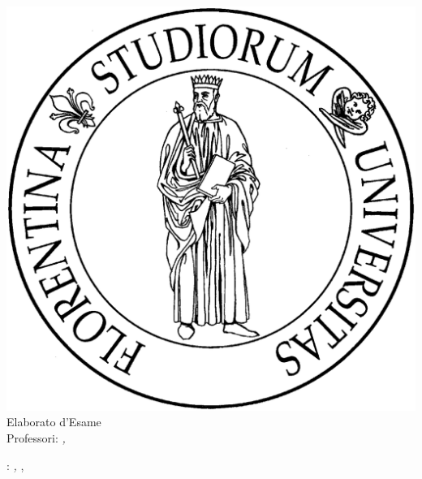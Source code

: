 \begin{titlepage}
	\begin{center}
   	\large
      \hfill
      \vfill
      \begingroup
			\spacedallcaps{\myUni} \\ 
			\myFaculty \\
			\myDegree \\ 
			\vspace{0.5cm}
         \includegraphics[scale=.065]{logo/unifi}\\
         \vspace{0.5cm}    
         Elaborato d'Esame
      \endgroup 
      \vfill 
      \begingroup
      	\color{Maroon}\spacedallcaps{\myTitle} \\ \bigskip
      \endgroup
      \spacedlowsmallcaps{\myName}
      \vfill  
      Professori: \itshape{\myProf}, \itshape{\myOtherProf}
      \vfill  
      \myTime
      \vfill                      
	\end{center}        
\end{titlepage}   
   \newpage
	\thispagestyle{empty}
	\hfill
	\vfill
	\noindent\myName: 
	\textit{\myTitle,} 
	\myDegree, \textcopyright\ \myTime

